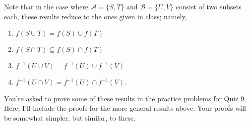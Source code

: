 \documentclass[letterpaper,12pt]{article}
\newcommand{\A}{\mathcal{A}}
\newcommand{\B}{\mathcal{B}}
\begin{document}
Note that in the case where $\A = \{S,T\}$  and $\B = \{U,V\}$ consist of two subsets each, these results reduce to the ones given in class; namely,
\begin{multicols}{2}
\begin{enumerate}
 \item $f(S\cup T) = f(S)\cup f(T)$
 \item $f(S\cap T) \subseteq f(S)\cap f(T)$
 \item $f^{-1}(U\cup V) = f^{-1}(U)\cup f^{-1}(V)$
 \item $f^{-1}(U\cap V) = f^{-1}(U)\cap f^{-1}(V)$.
\end{enumerate}
\end{multicols}
You're asked to prove some of these results in the practice problems for Quiz 9. Here, I'll include the proofs for the more general results above. Your proofs will be somewhat simpler, but similar, to these.
\end{document}
